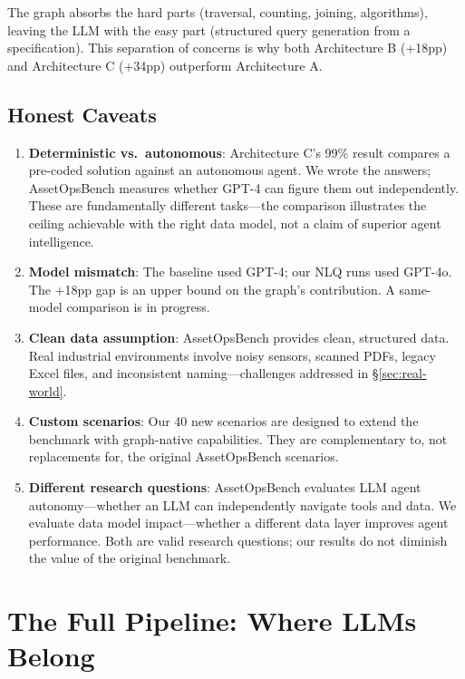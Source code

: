 \documentclass[11pt]{article}
\begin{document}
The graph absorbs the hard parts (traversal, counting, joining, algorithms), leaving the LLM with the easy part (structured query generation from a specification). This separation of concerns is why both Architecture B (+18pp) and Architecture C (+34pp) outperform Architecture A.

\subsection{Honest Caveats}
\label{sec:caveats}

\begin{enumerate}[leftmargin=*]
  \item \textbf{Deterministic vs.\ autonomous}: Architecture C's 99\% result compares a pre-coded solution against an autonomous agent. We wrote the answers; AssetOpsBench measures whether GPT-4 can figure them out independently. These are fundamentally different tasks---the comparison illustrates the ceiling achievable with the right data model, not a claim of superior agent intelligence.
  \item \textbf{Model mismatch}: The baseline used GPT-4; our NLQ runs used GPT-4o. The +18pp gap is an upper bound on the graph's contribution. A same-model comparison is in progress.
  \item \textbf{Clean data assumption}: AssetOpsBench provides clean, structured data. Real industrial environments involve noisy sensors, scanned PDFs, legacy Excel files, and inconsistent naming---challenges addressed in \S\ref{sec:real-world}.
  \item \textbf{Custom scenarios}: Our 40 new scenarios are designed to extend the benchmark with graph-native capabilities. They are complementary to, not replacements for, the original AssetOpsBench scenarios.
  \item \textbf{Different research questions}: AssetOpsBench evaluates LLM agent autonomy---whether an LLM can independently navigate tools and data. We evaluate data model impact---whether a different data layer improves agent performance. Both are valid research questions; our results do not diminish the value of the original benchmark.
\end{enumerate}

\section{The Full Pipeline: Where LLMs Belong}
\label{sec:pipeline}
\end{document}
